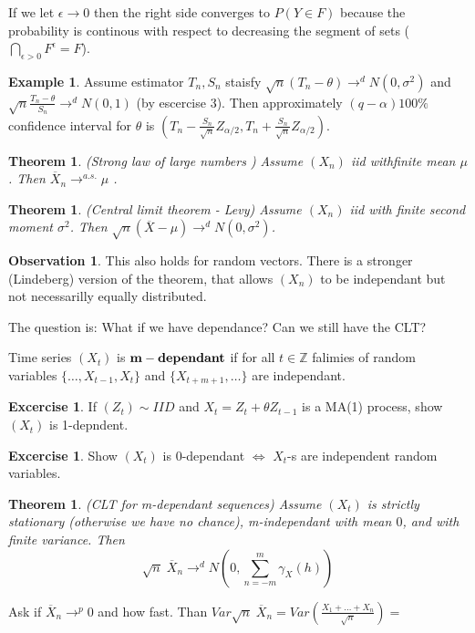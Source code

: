 \documentclass[12pt,a4paper]{amsart}
\theoremstyle{definition} %
\newtheorem{example}[defn]{Example}
\newtheorem{excercise}[defn]{Excercise}
\newtheorem{observation}[defn]{Observation}
\theoremstyle{plain} %
\newtheorem{theorem}[defn]{Theorem}
\newcommand{\Z}{\mathbb Z}
\begin{document}
If we let $\epsilon \rightarrow 0$ then the right side converges to $P(Y \in F)$ because the probability is continous with respect to decreasing the segment of sets ($\bigcap_{\epsilon > 0} F^\epsilon = F$).
\endproof

\begin{example}
Assume estimator $T_n, S_n$ staisfy $\sqrt{n}(T_n - \theta) \rightarrow^d N(0, \sigma^2)$ and $\sqrt{n}\frac{T_n - \theta}{S_n} \rightarrow^d N(0,1)$ (by escercise 3).
Then approximately $(q - \alpha) 100 \%$ confidence interval for $\theta$ is $(T_n - \frac{S_n}{\sqrt{n}}Z_{\alpha/2},T_n + \frac{S_n}{\sqrt{n}}Z_{\alpha/2})$.
\end{example}

\begin{theorem} (Strong law of large numbers )
Assume $(X_n)$ iid withfinite mean $\mu$. Then $\overline{X}_n \rightarrow^{a.s.} \mu$ .
\end{theorem}


\begin{theorem} (Central limit theorem - Levy)
Assume $(X_n)$ iid with finite second moment $\sigma^2$. Then $\sqrt{n}(\overline{X} - \mu) \rightarrow^d N(0, \sigma^2)$.
\end{theorem}


\begin{observation}
This also holds for random vectors. There is a stronger (Lindeberg) version of the theorem, that allows $(X_n)$ to be independant but not necessarilly equally distributed.
\end{observation}


The question is: What if we have dependance? Can we still have the CLT?

Time series $(X_t)$ is ${\bf m-dependant}$ if for all $t \in \Z$ falimies of random variables $\{\dots, X_{t-1}, X_t\}$ and $\{X_{t + m + 1}, \dots\}$ are independant. 

\begin{excercise}
If $(Z_t) \sim IID$ and $X_t = Z_t + \theta Z_{t-1}$ is a MA(1) process, show $(X_t)$ is 1-depndent.
\end{excercise}

\begin{excercise}
Show $(X_t)$ is 0-dependant $\Leftrightarrow$ $X_t$-s are independent random variables.
\end{excercise}

\begin{theorem} (CLT for m-dependant sequences)
Assume $(X_t)$ is strictly stationary (otherwise we have no chance), m-independant with mean $0$, and with finite variance. Then 
$$\sqrt{n}\;\overline{X}_n \rightarrow^d N(0, \sum_{n = -m}^m \gamma_X(h))$$
\end{theorem}
Ask if $\overline{X}_n \rightarrow^p 0$ and how fast. Than $Var\sqrt{n} \; \overline{X}_n = Var(\frac{X_1 + \dots + X_n}{\sqrt{n}}) =$
\end{document}
